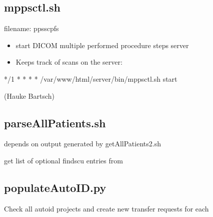 \documentclass[letterpaper,10pt,english]{sphinxmanual}
\begin{document}
\sphinxstepscope


\subsection{mppsctl.sh}
\label{\detokenize{Architecture/scripts/mppsctl:mppsctl-sh}}\label{\detokenize{Architecture/scripts/mppsctl::doc}}
\sphinxAtStartPar
filename: ppsscpfs
\begin{description}
\begin{itemize}
\item {} 
\sphinxAtStartPar
start DICOM multiple performed procedure steps server

\item {} 
\sphinxAtStartPar
Keeps track of scans on the server:

\end{itemize}

\end{description}

\begin{sphinxVerbatim}[commandchars=\\\{\}]
*/1 * * * * /var/www/html/server/bin/mppsctl.sh start
\end{sphinxVerbatim}

\sphinxAtStartPar
(Hauke Bartsch)

\sphinxstepscope


\subsection{parseAllPatients.sh}
\label{\detokenize{Architecture/scripts/parseAllPatients:parseallpatients-sh}}\label{\detokenize{Architecture/scripts/parseAllPatients::doc}}
\sphinxAtStartPar
depends on output generated by getAllPatients2.sh

\sphinxAtStartPar
get list of optional findscu entries from 

\sphinxstepscope


\subsection{populateAutoID.py}
\label{\detokenize{Architecture/scripts/populateAutoID:populateautoid-py}}\label{\detokenize{Architecture/scripts/populateAutoID::doc}}
\sphinxAtStartPar
Check all auto\sphinxhyphen{}id projects and create new transfer requests for each
\end{document}
